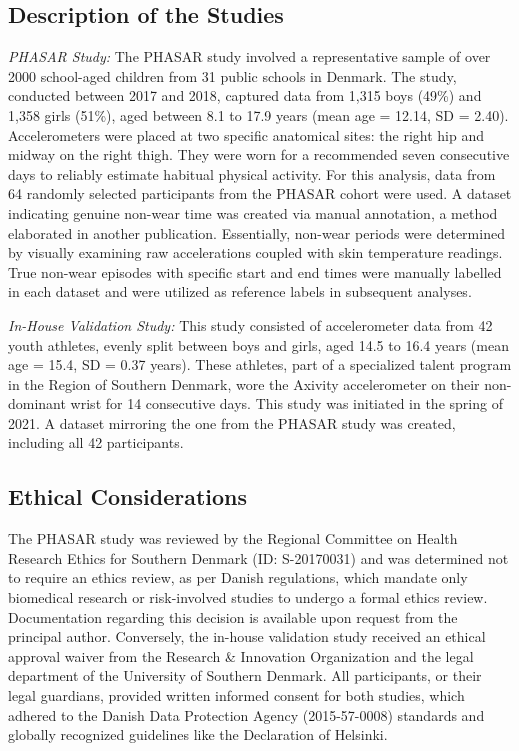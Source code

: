 \documentclass[
  9pt,
]{scrbook}
\begin{document}
\hypertarget{description-of-the-studies}{%
\subsection{Description of the
Studies}\label{description-of-the-studies}}

\emph{PHASAR Study:} The PHASAR study involved a representative sample
of over 2000 school-aged children from 31 public schools in Denmark. The
study, conducted between 2017 and 2018, captured data from 1,315 boys
(49\%) and 1,358 girls (51\%), aged between 8.1 to 17.9 years (mean age
= 12.14, SD = 2.40). Accelerometers were placed at two specific
anatomical sites: the right hip and midway on the right thigh. They were
worn for a recommended seven consecutive days to reliably estimate
habitual physical activity. For this analysis, data from 64 randomly
selected participants from the PHASAR cohort were used. A dataset
indicating genuine non-wear time was created via manual annotation, a
method elaborated in another publication. Essentially, non-wear periods
were determined by visually examining raw accelerations coupled with
skin temperature readings. True non-wear episodes with specific start
and end times were manually labelled in each dataset and were utilized
as reference labels in subsequent analyses.

\emph{In-House Validation Study:} This study consisted of accelerometer
data from 42 youth athletes, evenly split between boys and girls, aged
14.5 to 16.4 years (mean age = 15.4, SD = 0.37 years). These athletes,
part of a specialized talent program in the Region of Southern Denmark,
wore the Axivity accelerometer on their non-dominant wrist for 14
consecutive days. This study was initiated in the spring of 2021. A
dataset mirroring the one from the PHASAR study was created, including
all 42 participants.

\hypertarget{ethical-considerations}{%
\subsection{Ethical Considerations}\label{ethical-considerations}}

The PHASAR study was reviewed by the Regional Committee on Health
Research Ethics for Southern Denmark (ID: S-20170031) and was determined
not to require an ethics review, as per Danish regulations, which
mandate only biomedical research or risk-involved studies to undergo a
formal ethics review. Documentation regarding this decision is available
upon request from the principal author. Conversely, the in-house
validation study received an ethical approval waiver from the Research
\& Innovation Organization and the legal department of the University of
Southern Denmark. All participants, or their legal guardians, provided
written informed consent for both studies, which adhered to the Danish
Data Protection Agency (2015-57-0008) standards and globally recognized
guidelines like the Declaration of Helsinki.
\end{document}

